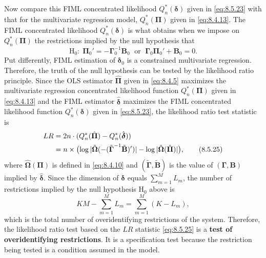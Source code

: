 Now compare this FIML concentrated likelihood $Q_n^*(\boldsymbol{\delta})$ given in \eqref{eq:8.5.23} with that
for the multivariate regression model, $Q_n^*(\boldsymbol{\Pi})$ given in \eqref{eq:8.4.13}. The FIML concentrated likelihood $Q_n^*(\boldsymbol{\delta})$ is what obtains when we impose on
$Q_n^*(\boldsymbol{\Pi})$ the restrictions
implied by the null hypothesis that
\begin{equation}
  \mathrm{H}_0:\;
  \boldsymbol{\Pi}_0' = -\boldsymbol{\Gamma}_0^{-1}\mathbf{B}_0
  \;\text{ or }\;
  \boldsymbol{\Gamma}_0\boldsymbol{\Pi}_0' + \mathbf{B}_0 = 0.
  \label{eq:8.5.24} \tag{8.5.24}
\end{equation}
Put differently, FIML estimation of $\boldsymbol{\delta}_0$ is a constrained multivariate regression.
Therefore, the truth of the null hypothesis can be tested by the likelihood ratio
principle. Since the OLS estimator $\hat{\boldsymbol{\Pi}}$ given in \eqref{eq:8.4.5} maximizes the multivariate
regression concentrated likelihood function $Q_n^*(\boldsymbol{\Pi})$ given in \eqref{eq:8.4.13} and the FIML
estimator $\hat{\boldsymbol{\delta}}$ maximizes the FIML concentrated likelihood function $Q_n^*(\boldsymbol{\delta})$ given in
\eqref{eq:8.5.23}, the likelihood ratio test statistic is
\begin{align}
  LR &= 2n \cdot (Q_n^*(\hat{\boldsymbol{\Pi}}) - Q_n^*(\hat{\boldsymbol{\delta}})) \notag \\
     &= n \times \bigl(\log|\hat{\boldsymbol{\Omega}}(-(\tilde{\boldsymbol{\Gamma}}^{-1}\tilde{\mathbf{B}})' )|
        - \log|\hat{\boldsymbol{\Omega}}(\hat{\boldsymbol{\Pi}})|\bigr),
  \label{eq:8.5.25} \tag{8.5.25}
\end{align}
where $\hat{\boldsymbol{\Omega}}(\boldsymbol{\Pi})$ is defined in \eqref{eq:8.4.10} and
$(\tilde{\boldsymbol{\Gamma}}, \tilde{\mathbf{B}})$ is the value of $(\boldsymbol{\Gamma}, \mathbf{B})$ implied by $\hat{\boldsymbol{\delta}}$.
Since the dimension of $\boldsymbol{\delta}$ equals $\sum_{m=1}^{M} L_m$, the number of restrictions implied by
the null hypothesis $\mathrm{H}_0$ above is
\begin{equation}
  KM - \sum_{m=1}^{M} L_m = \sum_{m=1}^{M}(K - L_m),
  \label{eq:8.5.26} \tag{8.5.26}
\end{equation}
which is the total number of overidentifying restrictions of the system. Therefore,
the likelihood ratio test based on the $LR$ statistic \eqref{eq:8.5.25} is a \textbf{test of overidentifying restrictions}. It is a specification test because the restriction being tested is a
condition assumed in the model.

